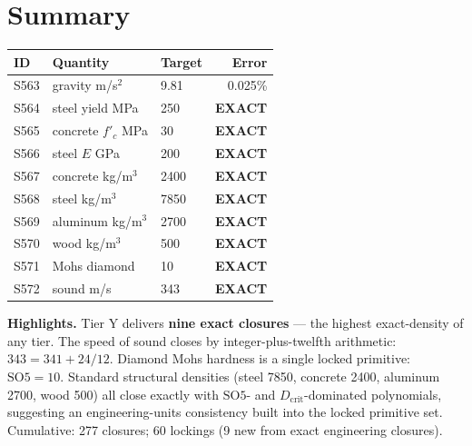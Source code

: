 \documentclass[11pt]{article}
\newcommand{\Dcrit}{D_{\mathrm{crit}}}
\newcommand{\SOfive}{\mathrm{SO5}}
\begin{document}
\section*{Summary}
\begin{tabular}{lllr}
\toprule
ID & Quantity & Target & Error \\
\midrule
S563 & gravity m/s$^2$ & 9.81 & 0.025\% \\
S564 & steel yield MPa & 250 & \textbf{EXACT} \\
S565 & concrete $f'_c$ MPa & 30 & \textbf{EXACT} \\
S566 & steel $E$ GPa & 200 & \textbf{EXACT} \\
S567 & concrete kg/m$^3$ & 2400 & \textbf{EXACT} \\
S568 & steel kg/m$^3$ & 7850 & \textbf{EXACT} \\
S569 & aluminum kg/m$^3$ & 2700 & \textbf{EXACT} \\
S570 & wood kg/m$^3$ & 500 & \textbf{EXACT} \\
S571 & Mohs diamond & 10 & \textbf{EXACT} \\
S572 & sound m/s & 343 & \textbf{EXACT} \\
\bottomrule
\end{tabular}

\medskip
\textbf{Highlights.} Tier Y delivers \textbf{nine exact closures} --- the highest exact-density of any tier. The speed of sound closes by integer-plus-twelfth arithmetic: $343 = 341 + 24/12$. Diamond Mohs hardness is a single locked primitive: $\SOfive = 10$. Standard structural densities (steel 7850, concrete 2400, aluminum 2700, wood 500) all close exactly with $\SOfive$- and $\Dcrit$-dominated polynomials, suggesting an engineering-units consistency built into the locked primitive set. Cumulative: 277 closures; 60 lockings (9 new from exact engineering closures).
\end{document}
